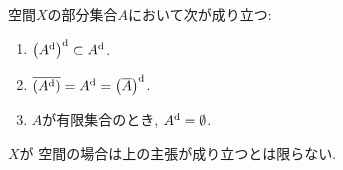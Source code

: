 \documentclass[uplatex, dvipdfmx, a4paper, 12pt, class=jsarticle, crop=false]{standalone}
\begin{document}
\begin{problem}[1.5.B]\label{eng-1-5-B-problem}
	 空間\(X\)の部分集合\(A\)において次が成り立つ:
	\begin{enumerate}
		\item \(\lrparen{A^\topd}^\topd \subset A^\topd\).
		\item \(\topbar{\lrparen{A^\topd}} = A^\topd
				=\lrparen{\topbar{A}}^\topd\).
		\item \(A\)が有限集合のとき, \(A^{\mathrm{d}} = \emptyset\).
	\end{enumerate}
	\(X\)が  空間の場合は上の主張が成り立つとは限らない.
\end{problem}
\end{document}
